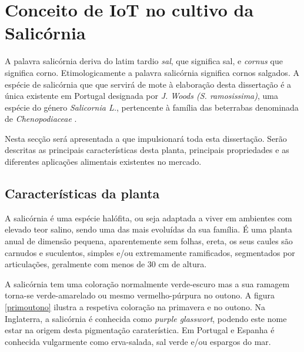 
\chapter{Conceito de IoT no cultivo da Salicórnia}

A palavra salicórnia deriva do latim tardio \textit{sal}, que significa sal, e \textit{cornus} que significa corno. Etimologicamente a palavra salicórnia significa cornos salgados\cite{chambers}. A espécie de salicórnia que que servirá de mote à elaboração desta dissertação é a única existente em Portugal designada por \sr \textit{J. Woods (S. ramosissima)}\cite{JoaoSilva}, uma espécie do género \textit{Salicornia L.}, pertencente à família das beterrabas denominada de \textit{Chenopodiaceae} \cite{chenopodiaceae}.

Nesta secção será apresentada a \sr que impulsionará toda esta dissertação. Serão descritas as principais características desta planta, principais propriedades e as diferentes aplicações alimentais existentes no mercado. 

\section{Características da planta}


A salicórnia é uma espécie halófita, ou seja adaptada a viver em ambientes com elevado teor salino\cite{ferri}, sendo uma das mais evoluídas da sua família. É uma planta anual de dimensão pequena, aparentemente sem folhas, ereta, os seus caules são carnudos e suculentos, simples e/ou extremamente ramificados, segmentados por articulações\cite{Silva2000}, geralmente com menos de 30 cm de altura\cite{overviewsal}.

A salicórnia tem uma coloração normalmente verde-escuro mas a sua ramagem torna-se  verde-amarelado ou mesmo vermelho-púrpura no outono\cite{Silva2000}. A figura \ref{primoutono} ilustra a respetiva coloração na primavera e no outono. Na Inglaterra, a salicórnia é conhecida como \textit{purple glasswort}, podendo este nome estar na origem desta pigmentação caraterística\cite{Davy2001}. Em Portugal e Espanha é conhecida vulgarmente como erva-salada, sal verde e/ou espargos do mar\cite{RaquelPinto}. 

